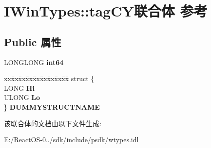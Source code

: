 \hypertarget{struct_i_win_types_1_1tag_c_y}{}\section{I\+Win\+Types\+:\+:tag\+C\+Y联合体 参考}
\label{struct_i_win_types_1_1tag_c_y}
\subsection*{Public 属性}
\begin{DoxyCompactItemize}
\item 
\mbox{\label{struct_i_win_types_1_1tag_c_y_adec005abbd7ba5bd02b1c387a644b0fd}} 
L\+O\+N\+G\+L\+O\+NG {\bfseries int64}
\item 
\mbox{\label{struct_i_win_types_1_1tag_c_y_ae257a54a91c90d1e8199419096571583}} 
\begin{tabbing}
xx\=xx\=xx\=xx\=xx\=xx\=xx\=xx\=xx\=\kill
struct \{\\
\>LONG {\bfseries Hi}\\
\>ULONG {\bfseries Lo}\\
\} {\bfseries DUMMYSTRUCTNAME}\\

\end{tabbing}\end{DoxyCompactItemize}


该联合体的文档由以下文件生成\+:\begin{DoxyCompactItemize}
\item 
E\+:/\+React\+O\+S-\/0../sdk/include/psdk/wtypes.\+idl\end{DoxyCompactItemize}
